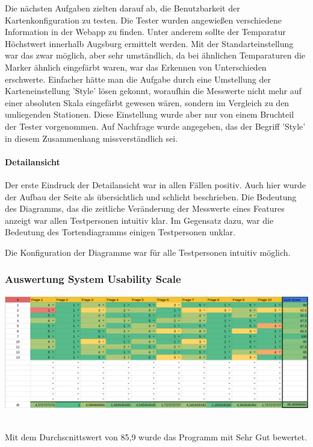         Die nächsten Aufgaben zielten darauf ab, die Benutzbarkeit der Kartenkonfiguration zu testen. Die Tester wurden angewießen verschiedene Information in der Webapp zu finden. Unter anderem sollte der Temparatur Höchstwert innerhalb Augsburg ermittelt werden. Mit der Standarteinstellung war das zwar möglich, aber sehr umständlich, da bei ähnlichen Temparaturen die Marker ähnlich eingefärbt waren, war das Erkennen von Unterschieden erschwerte.
        Einfacher hätte man die Aufgabe durch eine Umstellung der Karteneinstellung 'Style' lösen gekonnt, woraufhin die Messwerte nicht mehr auf einer absoluten Skala eingefärbt gewesen wären, sondern im Vergleich zu den umliegenden Stationen. Diese Einstellung wurde aber nur von einem Bruchteil der Tester vorgenommen. Auf Nachfrage wurde angegeben, das der Begriff 'Style' in diesem Zusammenhang missverständlich sei.
     
      \paragraph{Detailansicht}
        Der erste Eindruck der Detailansicht war in allen Fällen positiv. Auch hier wurde der Aufbau der Seite als übersichtlich und schlicht beschrieben.
        Die Bedeutung des Diagramms, das die zeitliche Veränderung der Messwerte eines \glspl{Feature} anzeigt war allen Testpersonen intuitiv klar. Im Gegensatz dazu, war die Bedeutung des Tortendiagramms einigen Testpersonen unklar.
        
        Die Konfiguration der Diagramme war für alle Testpersonen intuitiv möglich.
     
    \subsubsection{Auswertung System Usability Scale}
      \includegraphics[width=1\linewidth]{figures/sus.png}\par\vspace{1cm}
      \\
      Mit dem Durchscnittswert von 85,9 wurde das Programm mit Sehr Gut bewertet.

